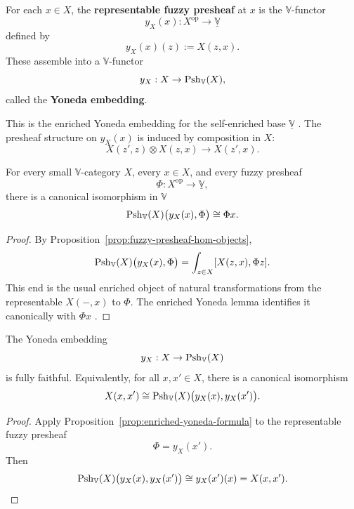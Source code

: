 \begin{definition}
\label{def:representable-fuzzy-presheaves}
    For each \(x\in X\), the \textbf{representable fuzzy presheaf} at \(x\) is the \(\mathbb V\)-functor
    \[
        y_X(x):X^{\mathrm{op}}\to \underline{\mathbb V}
    \]
    defined by
    \[
        y_X(x)(z):=X(z,x).
    \]
    These assemble into a \(\mathbb V\)-functor
    \[
        y_X:X\to \mathrm{Psh}_{\mathbb V}(X),
    \]
    called the \textbf{Yoneda embedding}.
\end{definition}

This is the enriched Yoneda embedding for the self-enriched base \(\underline{\mathbb V}\) \cite[Section~1.9]{Kelly1982BasicConcepts}. The presheaf structure on \(y_X(x)\) is induced by composition in \(X\):
\[
    X(z',z)\otimes X(z,x)
    \longrightarrow
    X(z',x).
\]

\begin{proposition}
\label{prop:enriched-yoneda-formula}
    For every small \(\mathbb V\)-category \(X\), every \(x\in X\), and every fuzzy presheaf
    \[
        \Phi:X^{\mathrm{op}}\to \underline{\mathbb V},
    \]
    there is a canonical isomorphism in \(\mathbb V\)
    \[
        \mathrm{Psh}_{\mathbb V}(X)\bigl(y_X(x),\Phi\bigr)
        \cong
        \Phi x.
    \]
\end{proposition}

\begin{proof}
    By Proposition~\ref{prop:fuzzy-presheaf-hom-objects},
    \[
        \mathrm{Psh}_{\mathbb V}(X)\bigl(y_X(x),\Phi\bigr)
        =
        \int_{z\in X}
        [X(z,x),\Phi z].
    \]
    This end is the usual enriched object of natural transformations from the representable \(X(-,x)\) to \(\Phi\). The enriched Yoneda lemma identifies it canonically with \(\Phi x\) \cite[Section~1.9]{Kelly1982BasicConcepts}.
\end{proof}

\begin{corollary}
\label{cor:enriched-yoneda-embedding}
    The Yoneda embedding
    \[
        y_X:X\to \mathrm{Psh}_{\mathbb V}(X)
    \]
    is fully faithful. Equivalently, for all \(x,x'\in X\), there is a canonical isomorphism
    \[
        X(x,x')
        \cong
        \mathrm{Psh}_{\mathbb V}(X)\bigl(y_X(x),y_X(x')\bigr).
    \]
\end{corollary}

\begin{proof}
    Apply Proposition~\ref{prop:enriched-yoneda-formula} to the representable fuzzy presheaf
    \[
        \Phi=y_X(x').
    \]
    Then
    \[
        \mathrm{Psh}_{\mathbb V}(X)\bigl(y_X(x),y_X(x')\bigr)
        \cong
        y_X(x')(x)
        =
        X(x,x').
    \]
\end{proof}

